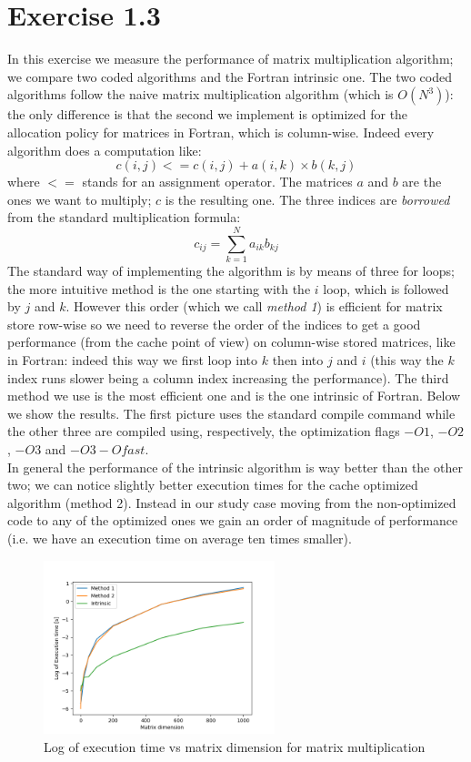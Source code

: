 \documentclass[a4paper,12pt]{article}
\begin{document}
\section*{Exercise 1.3}
In this exercise we measure the performance of matrix multiplication algorithm; we compare two coded algorithms and the Fortran intrinsic one. The two coded algorithms follow the naive matrix multiplication algorithm (which is $O(N^3)$): the only difference is that the second we implement is optimized for the allocation policy for matrices in Fortran, which is column-wise. Indeed every algorithm does a computation like:
\begin{equation*}
	c(i,j) <= c(i,j)+a(i,k) \times b(k,j)
\end{equation*}
where $<=$ stands for an assignment operator. The matrices $a$ and $b$ are the ones we want to multiply; $c$ is the resulting one. The three indices are \textit{borrowed} from the standard multiplication formula:
\begin{equation*}
	c_{ij} = \sum_{k=1}^N a_{ik} b_{kj}
\end{equation*}
The standard way of implementing the algorithm is by means of three for loops; the more intuitive method is the one starting with the $i$ loop, which is followed by $j$ and $k$. However this order (which we call \textit{method 1}) is efficient for matrix store row-wise so we need to reverse the order of the indices to get a good performance (from the cache point of view) on column-wise stored matrices, like in Fortran: indeed this way we first loop into $k$ then into $j$ and $i$ (this way the $k$ index runs slower being a column index increasing the performance). The third method we use is the most efficient one and is the one intrinsic of Fortran. Below we show the results. The first picture uses the standard compile command while the other three are compiled using, respectively, the optimization flags $-O1$, $-O2$, $-O3$ and $-O3 -Ofast$.\\
In general the performance of the intrinsic algorithm is way better than the other two; we can notice slightly better execution times for the cache optimized algorithm (method 2). Instead in our study case moving from the non-optimized code to any of the optimized ones we gain an order of magnitude of performance (i.e. we have an execution time on average ten times smaller).
\begin{figure}[h]
	\centering
	\includegraphics[width=0.6\textwidth]{perf.png}
	\caption{Log of execution time vs matrix dimension for matrix multiplication}
\end{figure}
\end{document}

